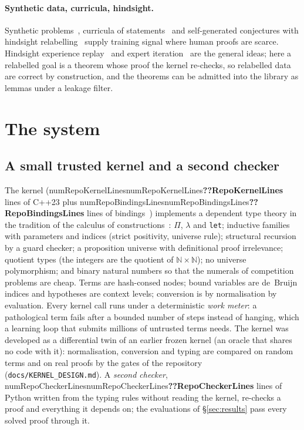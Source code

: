 \documentclass[10pt]{article}
\newcommand{\N}[1]{\ifcsname num#1\endcsname\csname num#1\endcsname\else\textbf{??#1}\fi}          %
\newcommand{\code}[1]{\texttt{#1}}
\begin{document}
\paragraph{Synthetic data, curricula, hindsight.}
Synthetic problems~\citep{wu2021int,wang2020learning,xin2024deepseek}, curricula of statements~\citep{polu2023formal} and self-generated conjectures with hindsight relabelling~\citep{poesia2024learning} supply training signal where human proofs are scarce.
Hindsight experience replay~\citep{andrychowicz2017hindsight} and expert iteration~\citep{anthony2017thinking,silver2017mastering} are the general ideas; here a relabelled goal is a theorem whose proof the kernel re-checks, so relabelled data are correct by construction, and the theorems can be admitted into the library as lemmas under a leakage filter.

\section{The system}\label{sec:system}

\subsection{A small trusted kernel and a second checker}\label{sec:kernel}
The kernel (\N{RepoKernelLines} lines of C++23 plus \N{RepoBindingsLines} lines of bindings~\citep{jakob2022nanobind}) implements a dependent type theory in the tradition of the calculus of constructions~\citep{coquand1988calculus}: $\Pi$, $\lambda$ and \code{let}; inductive families with parameters and indices (strict positivity, universe rule); structural recursion by a guard checker; a proposition universe with definitional proof irrelevance; quotient types (the integers are the quotient of $\mathbb N\times\mathbb N$); no universe polymorphism; and binary natural numbers so that the numerals of competition problems are cheap.
Terms are hash-consed nodes; bound variables are de~Bruijn indices and hypotheses are context levels; conversion is by normalisation by evaluation.
Every kernel call runs under a deterministic \emph{work meter}: a pathological term fails after a bounded number of steps instead of hanging, which a learning loop that submits millions of untrusted terms needs.
The kernel was developed as a differential twin of an earlier frozen kernel (an oracle that shares no code with it): normalisation, conversion and typing are compared on random terms and on real proofs by the gates of the repository (\code{docs/KERNEL\_DESIGN.md}).
A \emph{second checker}, \N{RepoCheckerLines} lines of Python written from the typing rules without reading the kernel, re-checks a proof and everything it depends on; the evaluations of \S\ref{sec:results} pass every solved proof through it.
\end{document}
